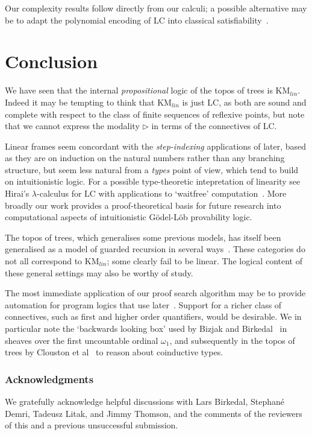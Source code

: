 \documentclass[envcountsect,envcountsame]{llncs}
\newcommand{\lcnxt}{\mathrm{KM}_{lin}}
\newcommand{\lglc}{\mathrm{LC}}
\newcommand{\nxt}{\rhd}
\begin{document}
Our complexity results follow directly from our calculi; a possible alternative
may be to adapt the polynomial encoding
of $\lglc$ into
classical satisfiability~\cite{chagrov-zakharyaschev-modal-logic}.


\section{Conclusion}

We have seen that 
the internal \emph{propositional} logic of the topos
of trees is $\lcnxt$. Indeed it may be tempting to think that $\lcnxt$
is just $\lglc$, as both are sound and complete with respect to the
class of finite sequences of reflexive points, but note that we cannot
express the modality $\nxt$ in terms of the connectives of $\lglc$.

Linear frames seem concordant with the \emph{step-indexing} applications of later,
based as they are on induction on the natural numbers rather than any
branching structure, but seem less natural from a \emph{types} point of
view, which tend to build on intuitionistic logic. For a possible type-theoretic
intepretation of linearity see Hirai's $\lambda$-calculus for $\lglc$ with applications to `waitfree' computation~\cite{Hirai:Lambda}. More broadly our work provides a
proof-theoretical basis for future research into computational aspects of intuitionistic
G\"{o}del-L\"{o}b provability logic.

The topos of trees, which generalises some previous models, has itself been
generalised as a model of guarded recursion in several ways~\cite{Birkedal:First,Birkedal:Intensional,Milius:Guard}. These categories do not all
correspond to $\lcnxt$; some clearly fail to be linear. The logical content of these
general settings may also be worthy of study.

The most immediate application of our proof search algorithm may be to provide
automation for program logics that use
later~\cite{Hobor:Oracle,Bengtson:Verifying,Clouston:Programming}. Support for
a richer class of connectives, such as first and higher order quantifiers, would be
desirable. We in particular note the `backwards looking box' used
by Bizjak and Birkedal~\cite{Bizjak:Model} in sheaves over the first uncountable
ordinal $\omega_1$, and subsequently in the topos of trees by Clouston et
al~\cite{Clouston:Programming} to reason about
coinductive types.

\subsubsection*{Acknowledgments}
We gratefully acknowledge helpful discussions with Lars Birkedal,
Stephan\'e Demri, Tadeusz Litak, and Jimmy Thomson, and the comments
of the reviewers of this and a previous unsuccessful submission.



\end{document}
